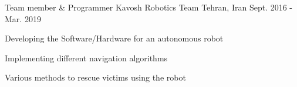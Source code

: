 \begin{cventries}

\cventry
{Team member \& Programmer} %
{Kavosh Robotics Team} %
{Tehran, Iran} %
{Sept. 2016 - Mar. 2019} %
{ %
\begin{cvitems}
\item {Developing the Software/Hardware for an autonomous robot}
\item {Implementing different navigation algorithms}
\item {Various methods to rescue victims using the robot}
\end{cvitems}
}


\end{cventries}